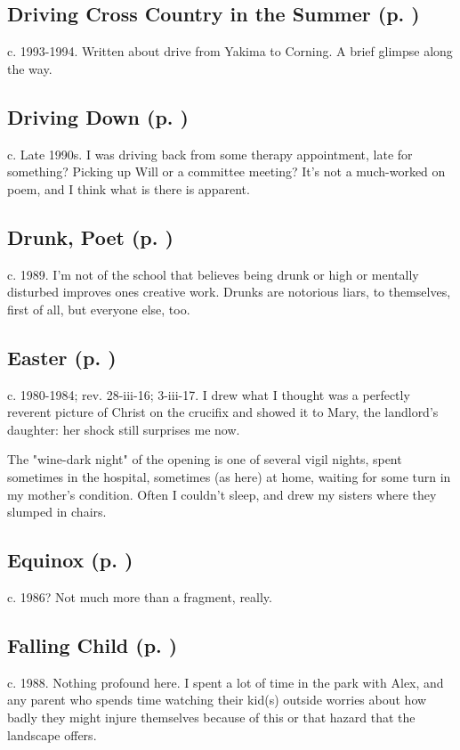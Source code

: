 \subsection*{Driving Cross Country in the Summer (p. \pageref{ch:driving_cross_country})}
c. 1993-1994. Written about drive from Yakima to
Corning. A brief glimpse along the way.

\subsection*{Driving Down (p. \pageref{ch:driving_down})}
c. Late 1990s. I was driving back from some therapy
appointment, late for something? Picking up Will or a committee meeting?
It's not a much-worked on poem, and I think what is there is
apparent.

\subsection*{Drunk, Poet (p. \pageref{ch:drunk_poet})}
c. 1989. I'm not of the school that believes being drunk
or high or mentally disturbed improves ones creative work. Drunks are
notorious liars, to themselves, first of all, but everyone else, too.

\subsection*{Easter (p. \pageref{ch:easter})}
c. 1980-1984; rev. 28-iii-16; 3-iii-17. I drew what I
thought was a perfectly reverent picture of Christ on the crucifix and
showed it to Mary, the landlord's daughter: her shock still surprises me
now.

The "wine-dark night" of the opening is one of several vigil nights,
spent sometimes in the hospital, sometimes (as here) at home, waiting
for some turn in my mother's condition. Often I couldn't sleep, and drew
my sisters where they slumped in chairs.

\subsection*{Equinox (p. \pageref{ch:equinox})}
c. 1986? Not much more than a fragment,
really.

\subsection*{Falling Child (p. \pageref{ch:falling_child})}
c. 1988. Nothing profound here. I spent a lot of time in
the park with Alex, and any parent who spends time watching their kid(s)
outside worries about how badly they might injure themselves because of
this or that hazard that the landscape offers.

